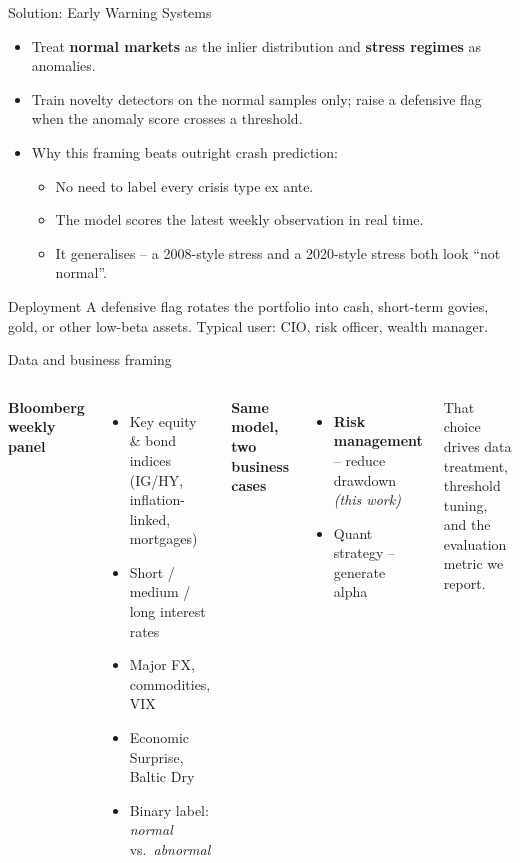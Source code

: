 \documentclass[10pt,aspectratio=169]{beamer}
\begin{document}
\begin{frame}{Solution: Early Warning Systems}
	\begin{itemize}
		\item Treat \textbf{normal markets} as the inlier distribution and \textbf{stress regimes} as anomalies.
		\item Train novelty detectors on the normal samples only; raise a defensive flag when the anomaly score crosses a threshold.
		\item Why this framing beats outright crash prediction:
		      \begin{itemize}
			      \item No need to label every crisis type ex ante.
			      \item The model scores the latest weekly observation in real time.
			      \item It generalises -- a 2008-style stress and a 2020-style stress both look ``not normal''.
		      \end{itemize}
	\end{itemize}
	\begin{alertblock}{Deployment}
		A defensive flag rotates the portfolio into cash, short-term govies, gold, or other low-beta assets. Typical user: CIO, risk officer, wealth manager.
	\end{alertblock}
\end{frame}

\begin{frame}{Data and business framing}
	\begin{columns}[T,onlytextwidth]
		\textbf{Bloomberg weekly panel}
		\begin{itemize}
			\item Key equity \& bond indices (IG/HY, inflation-linked, mortgages)
			\item Short / medium / long interest rates
			\item Major FX, commodities, VIX
			\item Economic Surprise, Baltic Dry
			\item Binary label: \emph{normal} vs.\ \emph{abnormal}
		\end{itemize}
		\textbf{Same model, two business cases}
		\begin{itemize}
			\item[\color{riskon}$\blacksquare$] \textbf{Risk management} -- reduce drawdown \\ \emph{(this work)}
			\item[\color{riskoff}$\blacksquare$] Quant strategy -- generate alpha
		\end{itemize}
		\vspace{0.4em}
		That choice drives data treatment, threshold tuning, and the evaluation metric we report.
	\end{columns}
\end{frame}
\end{document}
